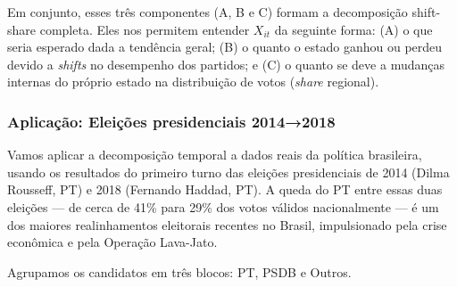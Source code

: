 \documentclass[
]{article}
\begin{document}
Em conjunto, esses três componentes (A, B e C) formam a decomposição shift-share completa. Eles nos permitem entender \(X_{it}\) da seguinte forma: (A) o que seria esperado dada a tendência geral; (B) o quanto o estado ganhou ou perdeu devido a \emph{shifts} no desempenho dos partidos; e (C) o quanto se deve a mudanças internas do próprio estado na distribuição de votos (\emph{share} regional).

\subsubsection{Aplicação: Eleições presidenciais 2014→2018}\label{aplicauxe7uxe3o-eleiuxe7uxf5es-presidenciais-20142018}

Vamos aplicar a decomposição temporal a dados reais da política brasileira, usando os resultados do primeiro turno das eleições presidenciais de 2014 (Dilma Rousseff, PT) e 2018 (Fernando Haddad, PT). A queda do PT entre essas duas eleições --- de cerca de 41\% para 29\% dos votos válidos nacionalmente --- é um dos maiores realinhamentos eleitorais recentes no Brasil, impulsionado pela crise econômica e pela Operação Lava-Jato.

Agrupamos os candidatos em três blocos: PT, PSDB e Outros.
\end{document}

